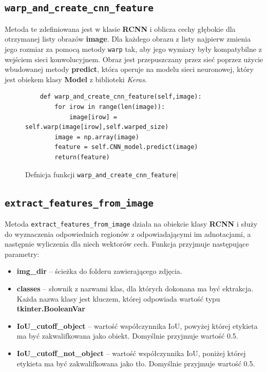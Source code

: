 \documentclass[a4paper,twoside,12pt]{book}
\begin{document}
\subsection{ \lstinline|warp_and_create_cnn_feature|}
{Metoda te zdefiniowana jest w klasie \textbf{RCNN} i oblicza cechy głębokie dla otrzymanej listy obrazów \textbf{image}. Dla każdego obrazu z listy najpierw zmienia jego rozmiar za pomocą metody \lstinline|warp| tak, aby jego wymiary były kompatybilne z wejściem sieci konwolucyjnem. Obraz jest przepuszczany przez sieć poprzez użycie wbudowanej metody \textbf{predict}, która operuje na modelu sieci neuronowej, który jest obiekem klasy \textbf{Model} z biblioteki \emph{Keras}. }
\begin{figure}[h!]
\centering
\begin{lstlisting}
    def warp_and_create_cnn_feature(self,image):
        for irow in range(len(image)):
            image[irow] = self.warp(image[irow],self.warped_size)
        image = np.array(image)
        feature = self.CNN_model.predict(image)
        return(feature)
\end{lstlisting}
\caption{Defnicja funkcji \lstinline|warp_and_create_cnn_feature||}
\label{warp}
\end{figure}
\subsection{\lstinline|extract_features_from_image|}
{Metoda \lstinline|extract_features_from_image| działa na obiekcie klasy \textbf{RCNN} i służy do wyznaczenia odpowiednich regionów z odpowiadającymi im adnotacjami, a następnie wyliczenia dla niech wektorów cech. Funkcja przyjmuje  następujące parametry:}
\begin{itemize}
\item {\textbf{img\_dir} – ścieżka do folderu zawierającego zdjęcia.}
\item {\textbf{classes} – słownik z nazwami klas, dla których dokonana ma być ektrakcja. Każda nazwa klasy jest kluczem, której odpowiada wartość typu \textbf{tkinter.BooleanVar}}
\item {\textbf{IoU\_cutoff\_object} – wartość współczynnika IoU, powyżej której etykieta ma być zakwalifkowana jako obiekt. Domyślnie przyjmuje wartość 0.5.}
\item {\textbf{IoU\_cutoff\_not\_object} – wartość współczynnika IoU, poniżej której etykieta ma być zakwalifkowana jako tło. Domyślnie przyjmuje wartość 0.5.}
\end{itemize}
\end{document}
